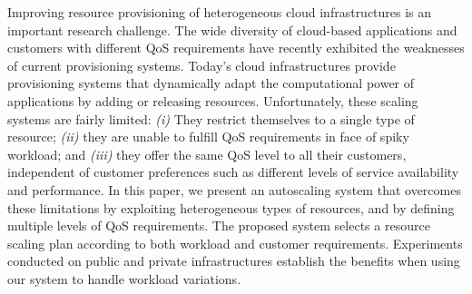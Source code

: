 Improving resource provisioning of heterogeneous cloud infrastructures is an important research challenge. The wide diversity of cloud-based applications and customers with different QoS requirements have recently exhibited the weaknesses of current provisioning systems. Today's cloud infrastructures provide provisioning systems that dynamically adapt the computational power of applications by adding or releasing resources. Unfortunately, these scaling systems are fairly limited: \emph{(i)} They restrict themselves to a single type of resource; \emph{(ii)} they are unable to fulfill QoS requirements in face of spiky workload; and \emph{(iii)} they offer the same QoS level to all their customers, independent of customer preferences such as different levels of service availability and performance. In this paper, we present an autoscaling system that overcomes these limitations by exploiting heterogeneous types of resources, and by defining multiple levels of QoS requirements. The proposed system selects a resource scaling plan according to both workload and customer requirements. Experiments conducted on public and private infrastructures establish the benefits when using our system to handle workload variations.
